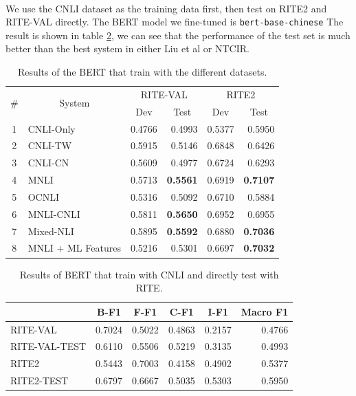 \documentclass{article}
\begin{document}
\begin{CJK*}{UTF8}{bkai}
\paragraph{}
We use the CNLI dataset as the training data first, then test on RITE2 and RITE-VAL directly. The BERT model we fine-tuned is \texttt{bert-base-chinese} The result is shown in table \ref{result:bert_cnli}, we can see that the performance of the test set is much better than the best system in either Liu et al or NTCIR.
\begin{table}[!ht]
  \centering
  \begin{tabular}{|c|l|r|r|r|r|}
  \hline
  \multirow{2}{*}{\#} & \multicolumn{1}{c|}{\multirow{2}{*}{System}} & \multicolumn{2}{c|}{RITE-VAL} & \multicolumn{2}{c|}{RITE2} \\ \cline{3-6}
   & \multicolumn{1}{c|}{} & \multicolumn{1}{c|}{Dev} & \multicolumn{1}{c|}{Test} & \multicolumn{1}{c|}{Dev} & \multicolumn{1}{c|}{Test} \\ \hline
  1 & CNLI-Only & 0.4766 & 0.4993 & 0.5377 & 0.5950 \\ \hline
  2 & CNLI-TW & 0.5915 & 0.5146 & 0.6848 & 0.6426 \\ \hline
  3 & CNLI-CN & 0.5609 & 0.4977 & 0.6724 & 0.6293 \\ \hline
  4 & MNLI & 0.5713 & \textbf{0.5561} & 0.6919 & \textbf{0.7107} \\ \hline
  5 & OCNLI & 0.5316 & 0.5092 & 0.6710 & 0.5884 \\ \hline
  6 & MNLI-CNLI & 0.5811 & \textbf{0.5650} & 0.6952 & 0.6955 \\ \hline
  7 & Mixed-NLI & 0.5895 & \textbf{0.5592} & 0.6880 & \textbf{0.7036} \\ \hline
  8 & MNLI + ML Features & 0.5216 & 0.5301 & 0.6697 & \textbf{0.7032} \\ \hline
  \end{tabular}
  \caption{Results of the BERT that train with the different datasets.}
  \label{result:bert_compare}
\end{table}

\begin{table}[ht!]
  \centering
  \begin{tabular}{|l|r|r|r|r|r|}
  \hline
   & \multicolumn{1}{c|}{B-F1} & \multicolumn{1}{c|}{F-F1} & \multicolumn{1}{c|}{C-F1} & \multicolumn{1}{c|}{I-F1} & \multicolumn{1}{c|}{Macro F1} \\ \hline
  RITE-VAL & 0.7024 & 0.5022 & 0.4863 & 0.2157 & 0.4766 \\ \hline
  RITE-VAL-TEST & 0.6110 & 0.5506 & 0.5219 & 0.3135 & 0.4993 \\ \hline
  RITE2 & 0.5443 & 0.7003 & 0.4158 & 0.4902 & 0.5377 \\ \hline
  RITE2-TEST & 0.6797 & 0.6667 & 0.5035 & 0.5303 & 0.5950 \\ \hline
  \end{tabular}
  \caption{Results of BERT that train with CNLI and directly test with RITE.}
  \label{result:bert_cnli}
\end{table}


\end{CJK*}
\end{document}
